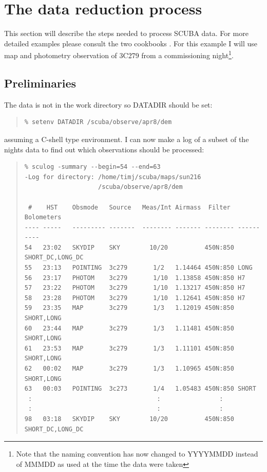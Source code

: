 \documentclass[twoside,11pt]{article}
\newenvironment{myquote}{\begin{quote}\begin{small}}{\end{small}\end{quote}}
\newcommand{\xlabel}[1]{}
\renewcommand{\_}{\texttt{\symbol{95}}}
\begin{document}
\section{\xlabel{reduction}The data reduction process\label{reduction}}

This section will describe the steps needed to process SCUBA data. For more
detailed examples please consult the two cookbooks \cite{S97,SANDELL97}.
For this example I will use map and photometry observation of 3C279
from a commissioning night\footnote{Note that the naming convention has now
changed to YYYYMMDD instead of MMMDD as used at the time the data were
taken}.

\subsection{Preliminaries}
\label{prelim}

The data is not in the work directory so DATADIR should be set:

\begin{myquote}
\begin{verbatim}
% setenv DATADIR /scuba/observe/apr8/dem
\end{verbatim}
\end{myquote}

assuming a C-shell type environment. I can now make a log of a subset
of the nights data to find out which observations should be processed:

\begin{myquote}
\begin{verbatim}
% sculog -summary --begin=54 --end=63
-Log for directory: /home/timj/scuba/maps/sun216
                    /scuba/observe/apr8/dem
 
 #    HST    Obsmode   Source   Meas/Int Airmass  Filter  Bolometers
---- -----   --------- -------  -------- ------- -------- ----------
54   23:02   SKYDIP    SKY        10/20          450N:850 SHORT_DC,LONG_DC
55   23:13   POINTING  3c279       1/2   1.14464 450N:850 LONG
56   23:17   PHOTOM    3c279       1/10  1.13858 450N:850 H7
57   23:22   PHOTOM    3c279       1/10  1.13217 450N:850 H7
58   23:28   PHOTOM    3c279       1/10  1.12641 450N:850 H7
59   23:35   MAP       3c279       1/3   1.12019 450N:850 SHORT,LONG
60   23:44   MAP       3c279       1/3   1.11481 450N:850 SHORT,LONG
61   23:53   MAP       3c279       1/3   1.11101 450N:850 SHORT,LONG
62   00:02   MAP       3c279       1/3   1.10965 450N:850 SHORT,LONG
63   00:03   POINTING  3c273       1/4   1.05483 450N:850 SHORT
 :                                  :                :
 :                                  :                :
98   03:18   SKYDIP    SKY        10/20          450N:850 SHORT_DC,LONG_DC
\end{verbatim}
\end{myquote}
\end{document}
